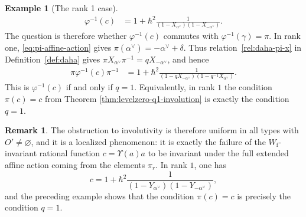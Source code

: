 \documentclass{amsart}
\theoremstyle{definition}
\newtheorem{Rem}[Thm]{Remark}
\newtheorem{Ex}[Thm]{Example}
\numberwithin{equation}{section}
\begin{document}
\begin{Ex}[The rank 1 case]
\begin{align*}
    \varphi^{-1}(c) & = 1 + \hbar^2 \frac{1}{(1 - X_{\alpha^\vee})(1 - X_{-\alpha^\vee})}.
\end{align*}
The question is therefore whether \(\varphi^{-1}(c)\) commutes with
\(\varphi^{-1}(\gamma)=\pi\). In rank one,
\eqref{eq:pi-affine-action} gives
\(\pi(\alpha^\vee)=-\alpha^\vee+\delta\). Thus
relation~\ref{rel:daha-pi-x} in Definition~\ref{def:daha} gives
\(\pi X_{\alpha^\vee}\pi^{-1}=qX_{-\alpha^\vee}\), and hence
\begin{align*}
    \pi \varphi^{-1}(c)\pi^{-1} & = 1 + \hbar^2 \frac{1}{(1 - qX_{-\alpha^\vee})(1 - q^{-1}X_{\alpha^\vee})}.
\end{align*}
This is \(\varphi^{-1}(c)\) if and only if $q=1$. Equivalently, in rank $1$ the condition $\pi(c)=c$ from Theorem \ref{thm:levelzero-q1-involution} is exactly the condition $q=1$.
\end{Ex}

\begin{Rem}
The obstruction to involutivity is therefore uniform in all types with
$O'\neq\varnothing$, and it is a localized phenomenon: it is exactly the failure
of the $W_{\mathrm f}$-invariant rational function \(c=\Upsilon(a)a\) to be invariant
under the full extended affine action coming from the elements $\pi_r$. In rank $1$, one has
\[
c=1+\hbar^2\frac{1}{(1-Y_{\alpha^\vee})(1-Y_{-\alpha^\vee})},
\]
and the preceding example shows that the condition $\pi(c)=c$ is precisely the condition $q=1$.
\end{Rem}



\end{document}

